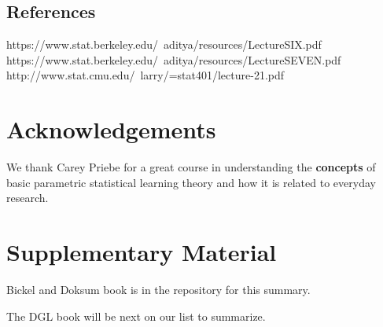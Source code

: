 \documentclass{article}
\theoremstyle{definition}
\theoremstyle{remark}
\newcommand{\beginsupplement}{%
        \setcounter{table}{0}
        \renewcommand{\thetable}{S\arabic{table}}%
        \setcounter{figure}{0}
        \renewcommand{\thefigure}{S\arabic{figure}}%
     }
\begin{document}
	\subsection{References}
		https://www.stat.berkeley.edu/~aditya/resources/LectureSIX.pdf
		https://www.stat.berkeley.edu/~aditya/resources/LectureSEVEN.pdf
		http://www.stat.cmu.edu/~larry/=stat401/lecture-21.pdf
		
\section{Acknowledgements}
  
  We thank Carey Priebe for a great course in understanding the \textbf{concepts} of basic parametric statistical learning theory and how it is related to everyday research. 



\newpage
\section{Supplementary Material}
\beginsupplement

Bickel and Doksum book is in the repository for this summary.

The DGL book will be next on our list to summarize.
  
\clearpage
\newpage
  
\end{document}
